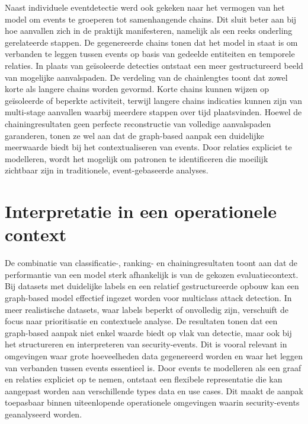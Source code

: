 Naast individuele eventdetectie werd ook gekeken naar het vermogen van het model om events te groeperen tot samenhangende chains. Dit sluit beter aan bij hoe aanvallen zich in de praktijk manifesteren, namelijk als een reeks onderling gerelateerde stappen.
\newline
\newline
De gegenereerde chains tonen dat het model in staat is om verbanden te leggen tussen events op basis van gedeelde entiteiten en temporele relaties. In plaats van geïsoleerde detecties ontstaat een meer gestructureerd beeld van mogelijke aanvalspaden.
\newline
\newline
De verdeling van de chainlengtes toont dat zowel korte als langere chains worden gevormd. Korte chains kunnen wijzen op geïsoleerde of beperkte activiteit, terwijl langere chains indicaties kunnen zijn van multi-stage aanvallen waarbij meerdere stappen over tijd plaatsvinden.
\newline
\newline
Hoewel de chainingresultaten geen perfecte reconstructie van volledige aanvalspaden garanderen, tonen ze wel aan dat de graph-based aanpak een duidelijke meerwaarde biedt bij het contextualiseren van events. Door relaties expliciet te modelleren, wordt het mogelijk om patronen te identificeren die moeilijk zichtbaar zijn in traditionele, event-gebaseerde analyses.

\section{Interpretatie in een operationele context}

De combinatie van classificatie-, ranking- en chainingresultaten toont aan dat de performantie van een model sterk afhankelijk is van de gekozen evaluatiecontext.
\newline
\newline
Bij datasets met duidelijke labels en een relatief gestructureerde opbouw kan een graph-based model effectief ingezet worden voor multiclass attack detection. In meer realistische datasets, waar labels beperkt of onvolledig zijn, verschuift de focus naar prioritisatie en contextuele analyse.
\newline
\newline
De resultaten tonen dat een graph-based aanpak niet enkel waarde biedt op vlak van detectie, maar ook bij het structureren en interpreteren van security-events. Dit is vooral relevant in omgevingen waar grote hoeveelheden data gegenereerd worden en waar het leggen van verbanden tussen events essentieel is.
\newline
\newline
Door events te modelleren als een graaf en relaties expliciet op te nemen, ontstaat een flexibele representatie die kan aangepast worden aan verschillende types data en use cases. Dit maakt de aanpak toepasbaar binnen uiteenlopende operationele omgevingen waarin security-events geanalyseerd worden.



